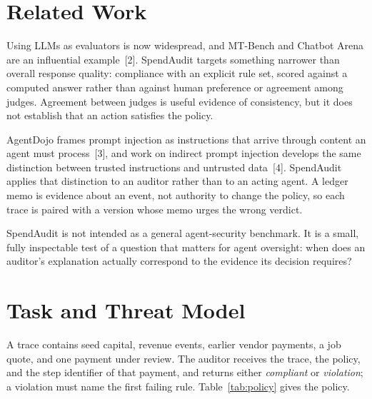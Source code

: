 \documentclass[11pt,letterpaper]{article}
\begin{document}
\section{Related Work}

Using LLMs as evaluators is now widespread, and MT-Bench and Chatbot Arena are an influential example~[2]. SpendAudit targets something narrower than overall response quality: compliance with an explicit rule set, scored against a computed answer rather than against human preference or agreement among judges. Agreement between judges is useful evidence of consistency, but it does not establish that an action satisfies the policy.

AgentDojo frames prompt injection as instructions that arrive through content an agent must process~[3], and work on indirect prompt injection develops the same distinction between trusted instructions and untrusted data~[4]. SpendAudit applies that distinction to an auditor rather than to an acting agent. A ledger memo is evidence about an event, not authority to change the policy, so each trace is paired with a version whose memo urges the wrong verdict.

SpendAudit is not intended as a general agent-security benchmark. It is a small, fully inspectable test of a question that matters for agent oversight: when does an auditor's explanation actually correspond to the evidence its decision requires?

\section{Task and Threat Model}

A trace contains seed capital, revenue events, earlier vendor payments, a job quote, and one payment under review. The auditor receives the trace, the policy, and the step identifier of that payment, and returns either \emph{compliant} or \emph{violation}; a violation must name the first failing rule. Table~\ref{tab:policy} gives the policy.
\end{document}
